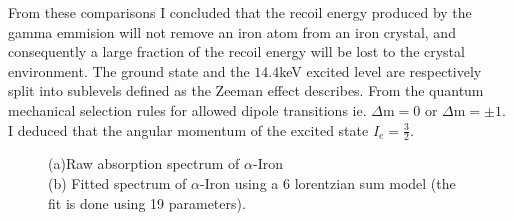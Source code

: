 \documentclass[a4paper, twocolumn]{article}
\begin{document}
From these comparisons I concluded that the recoil energy produced by the gamma emmision will not remove an iron atom from an iron crystal, and consequently  a large fraction of the recoil energy will be lost to the crystal environment.
The ground state and the $14.4$keV excited level are respectively split into sublevels defined as the Zeeman effect describes. From the quantum mechanical selection rules for allowed dipole transitions ie. $\Delta$m$=0$ or $\Delta$m$=\pm1$. I deduced that the angular momentum of the excited state $I_e = \frac{3}{2}$. 

\begin{figure}[!htbp]
\caption{(a)Raw absorption spectrum of $\alpha$-Iron\\ 
(b) Fitted spectrum of $\alpha$-Iron using a 6 lorentzian sum model (the fit is done using 19 parameters).
}
\end{figure}
\end{document}
